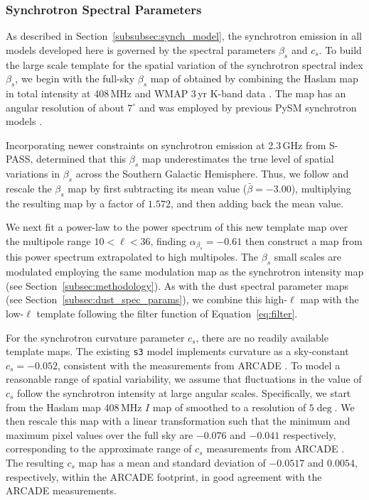 \documentclass[twocolumn]{aastex631}
\begin{document}
\subsubsection{Synchrotron Spectral Parameters}\label{sec:beta_s}
As described in Section~\ref{subsubsec:synch_model}, the synchrotron emission in all models developed here is governed by the spectral parameters $\beta_s$ and $c_s$. To build the large scale template for the spatial variation of the synchrotron spectral index $\beta_s$, we begin with the full-sky $\beta_s$ map of \citet{Miville-Deschenes:2008} obtained by combining the Haslam map in total intensity at 408\,MHz \citep{Remazeilles:2015} and WMAP 3\,yr K-band data \citep{Hinshaw:2007}. The map has an angular resolution of about $7^{\circ}$ and was employed by previous PySM synchrotron models \citep{Thorne:2017}.

Incorporating newer constraints on synchrotron emission at 2.3\,GHz from S-PASS, \citet{Krachmalnicoff:2018} determined that this $\beta_s$ map underestimates the true level of spatial variations in $\beta_s$ across the Southern Galactic Hemisphere. Thus, we follow \citet{Krachmalnicoff:2018} and rescale the $\beta_s$ map by first subtracting its mean value ($\bar{\beta} = -3.00$), multiplying the resulting map by a factor of $1.572$, and then adding back the mean value.

We next fit a power-law to the power spectrum of this new template map over the multipole range $10 < \ell < 36$, finding $\alpha_{\beta_s}=-0.61$ then construct a map from this power spectrum extrapolated to high multipoles. The $\beta_s$ small scales are modulated employing the same modulation map as the synchrotron intensity map (see Section~\ref{subsec:methodology}). As with the dust spectral parameter maps (see Section~\ref{subsec:dust_spec_params}), we combine this high-$\ell$ map with the low-$\ell$ template following the filter function of Equation~\ref{eq:filter}.
 
For the synchrotron curvature parameter $c_s$, there are no readily available template maps. The existing \texttt{s3} model implements curvature as a sky-constant $c_s = -0.052$, consistent with the measurements from ARCADE \citep[$c_s=-0.052 \pm 0.005$,][]{Kogut:2012}. To model a reasonable range of spatial variability, we assume that fluctuations in the value of $c_s$ follow the synchrotron intensity at large angular scales. Specifically, we start from the Haslam map 408\,MHz $I$ map of \citet{Remazeilles:2015} smoothed to a resolution of $5 \deg$. We then rescale this map with a linear transformation such that the minimum and maximum pixel values over the full sky are $-0.076$ and $-0.041$ respectively, corresponding to the approximate range of $c_s$ measurements from ARCADE \citep[][Figure~6]{Kogut:2012}. The resulting $c_s$ map has a mean and standard deviation of $-0.0517$ and $0.0054$, respectively, within the ARCADE footprint, in good agreement with the ARCADE measurements.
\end{document}
